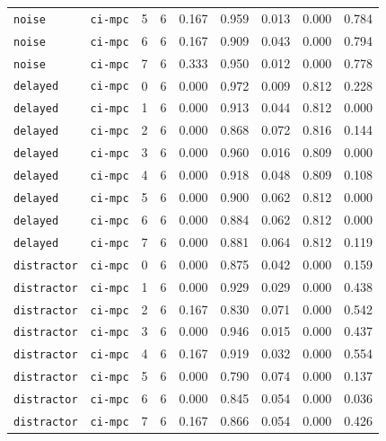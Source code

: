 \documentclass{article}
\begin{document}
\begin{center}
\begin{tabular}{lllcccccc}
\texttt{noise} & \texttt{ci-mpc} & 5 & 6 & 0.167 & 0.959 & 0.013 & 0.000 & 0.784 \\
\texttt{noise} & \texttt{ci-mpc} & 6 & 6 & 0.167 & 0.909 & 0.043 & 0.000 & 0.794 \\
\texttt{noise} & \texttt{ci-mpc} & 7 & 6 & 0.333 & 0.950 & 0.012 & 0.000 & 0.778 \\
\texttt{delayed} & \texttt{ci-mpc} & 0 & 6 & 0.000 & 0.972 & 0.009 & 0.812 & 0.228 \\
\texttt{delayed} & \texttt{ci-mpc} & 1 & 6 & 0.000 & 0.913 & 0.044 & 0.812 & 0.000 \\
\texttt{delayed} & \texttt{ci-mpc} & 2 & 6 & 0.000 & 0.868 & 0.072 & 0.816 & 0.144 \\
\texttt{delayed} & \texttt{ci-mpc} & 3 & 6 & 0.000 & 0.960 & 0.016 & 0.809 & 0.000 \\
\texttt{delayed} & \texttt{ci-mpc} & 4 & 6 & 0.000 & 0.918 & 0.048 & 0.809 & 0.108 \\
\texttt{delayed} & \texttt{ci-mpc} & 5 & 6 & 0.000 & 0.900 & 0.062 & 0.812 & 0.000 \\
\texttt{delayed} & \texttt{ci-mpc} & 6 & 6 & 0.000 & 0.884 & 0.062 & 0.812 & 0.000 \\
\texttt{delayed} & \texttt{ci-mpc} & 7 & 6 & 0.000 & 0.881 & 0.064 & 0.812 & 0.119 \\
\texttt{distractor} & \texttt{ci-mpc} & 0 & 6 & 0.000 & 0.875 & 0.042 & 0.000 & 0.159 \\
\texttt{distractor} & \texttt{ci-mpc} & 1 & 6 & 0.000 & 0.929 & 0.029 & 0.000 & 0.438 \\
\texttt{distractor} & \texttt{ci-mpc} & 2 & 6 & 0.167 & 0.830 & 0.071 & 0.000 & 0.542 \\
\texttt{distractor} & \texttt{ci-mpc} & 3 & 6 & 0.000 & 0.946 & 0.015 & 0.000 & 0.437 \\
\texttt{distractor} & \texttt{ci-mpc} & 4 & 6 & 0.167 & 0.919 & 0.032 & 0.000 & 0.554 \\
\texttt{distractor} & \texttt{ci-mpc} & 5 & 6 & 0.000 & 0.790 & 0.074 & 0.000 & 0.137 \\
\texttt{distractor} & \texttt{ci-mpc} & 6 & 6 & 0.000 & 0.845 & 0.054 & 0.000 & 0.036 \\
\texttt{distractor} & \texttt{ci-mpc} & 7 & 6 & 0.167 & 0.866 & 0.054 & 0.000 & 0.426 \\
\bottomrule
\end{tabular}
\end{center}
\end{document}
